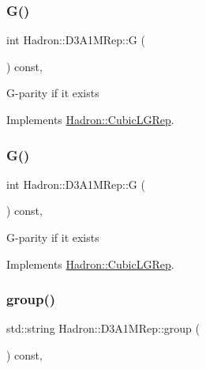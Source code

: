 \subsubsection{\texorpdfstring{G()}{G()}\hspace{0.1cm}{\footnotesize\ttfamily [2/3]}}
{\footnotesize\ttfamily int Hadron\+::\+D3\+A1\+M\+Rep\+::G (\begin{DoxyParamCaption}{ }\end{DoxyParamCaption}) const\hspace{0.3cm}{\ttfamily [inline]}, {\ttfamily [virtual]}}

G-\/parity if it exists 

Implements \mbox{\hyperlink{structHadron_1_1CubicLGRep_ace26f7b2d55e3a668a14cb9026da5231}{Hadron\+::\+Cubic\+L\+G\+Rep}}.

\mbox{\label{structHadron_1_1D3A1MRep_aed0335625e2422a4694e6b30fdae9470}} 
\subsubsection{\texorpdfstring{G()}{G()}\hspace{0.1cm}{\footnotesize\ttfamily [3/3]}}
{\footnotesize\ttfamily int Hadron\+::\+D3\+A1\+M\+Rep\+::G (\begin{DoxyParamCaption}{ }\end{DoxyParamCaption}) const\hspace{0.3cm}{\ttfamily [inline]}, {\ttfamily [virtual]}}

G-\/parity if it exists 

Implements \mbox{\hyperlink{structHadron_1_1CubicLGRep_ace26f7b2d55e3a668a14cb9026da5231}{Hadron\+::\+Cubic\+L\+G\+Rep}}.

\mbox{\label{structHadron_1_1D3A1MRep_a900d5acc0d3ed9cf5f3f97537f43d8e7}} 
\subsubsection{\texorpdfstring{group()}{group()}\hspace{0.1cm}{\footnotesize\ttfamily [1/3]}}
{\footnotesize\ttfamily std\+::string Hadron\+::\+D3\+A1\+M\+Rep\+::group (\begin{DoxyParamCaption}{ }\end{DoxyParamCaption}) const\hspace{0.3cm}{\ttfamily [inline]}, {\ttfamily [virtual]}}

